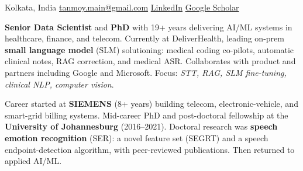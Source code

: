\documentclass[11pt,a4paper]{article}
\begin{document}


\noindent
{Kolkata, India} \bull
\href{mailto:tanmoy.main@gmail.com}{tanmoy.main@gmail.com} \bull
{} \bull
\href{https://www.linkedin.com/in/tanmoy-roy-328b592b}{LinkedIn} \bull
\href{https://scholar.google.com/citations?user=FweJmHYAAAAJ\&hl=en}{Google Scholar}

\spacedhrule{0.3em}{0.5em}



\vspace{.2cm}

\noindent
\textbf{Senior Data Scientist} and \textbf{PhD} with 19+ years delivering AI/ML systems in healthcare, finance, and telecom. Currently at DeliverHealth, leading on-prem \textbf{small language model} (SLM) solutioning: medical coding co-pilots, automatic clinical notes, RAG correction, and medical ASR. Collaborates with product and partners including Google and Microsoft. Focus: \textit{STT, RAG, SLM fine-tuning, clinical NLP, computer vision}.

\vspace{.2cm}

\noindent
Career started at \textbf{SIEMENS} (8+ years) building telecom, electronic-vehicle, and smart-grid billing systems. Mid-career PhD and post-doctoral fellowship at the \textbf{University of Johannesburg} (2016--2021). Doctoral research was \textbf{speech emotion recognition} (SER): a novel feature set (SEGRT) and a speech endpoint-detection algorithm, with peer-reviewed publications. Then returned to applied AI/ML.

\spacedhrule{0.3em}{0.5em}



\vspace{.2cm}
\end{document}
